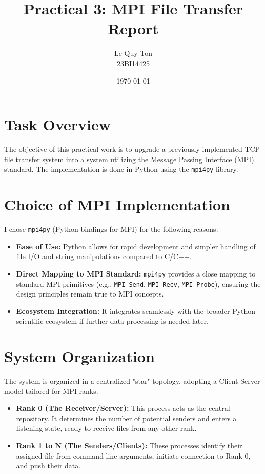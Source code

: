 \documentclass[11pt,a4paper]{article}
\title{Practical 3: MPI File Transfer Report}
\author{Le Quy Ton \\ 23BI14425}
\date{\today}
\begin{document}
\maketitle

\section{Task Overview}
The objective of this practical work is to upgrade a previously implemented TCP file transfer system into a system utilizing the Message Passing Interface (MPI) standard. The implementation is done in Python using the \texttt{mpi4py} library.

\section{Choice of MPI Implementation}
I chose \texttt{mpi4py} (Python bindings for MPI) for the following reasons:
\begin{itemize}
    \item \textbf{Ease of Use:} Python allows for rapid development and simpler handling of file I/O and string manipulations compared to C/C++.
    
    \item \textbf{Direct Mapping to MPI Standard:} \texttt{mpi4py} provides a close mapping to standard MPI primitives (e.g., \texttt{MPI\_Send}, \texttt{MPI\_Recv}, \texttt{MPI\_Probe}), ensuring the design principles remain true to MPI concepts.
    
    \item \textbf{Ecosystem Integration:} It integrates seamlessly with the broader Python scientific ecosystem if further data processing is needed later.
\end{itemize}

\section{System Organization}
The system is organized in a centralized "star" topology, adopting a Client-Server model tailored for MPI ranks.

\begin{itemize}
    \item \textbf{Rank 0 (The Receiver/Server):} This process acts as the central repository. It determines the number of potential senders and enters a listening state, ready to receive files from any other rank.
    
    \item \textbf{Rank 1 to N (The Senders/Clients):} These processes identify their assigned file from command-line arguments, initiate connection to Rank 0, and push their data.
\end{itemize}
\end{document}
